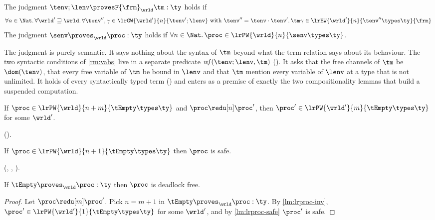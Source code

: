 \begin{definition}
\label{def:sem-judgments}
  The judgment $\tenv ; \lenv \provesF{\frm}_{\wrld} \tm : \ty$ holds if
  \[
    \forall n \in \Nat.\,
      \forall \wrld' \mathrel{\sqsupseteq} \wrld.\,
        \forall \tenv'', \gamma \in \lrGW{\wrld'}{n}{\tenv' ; \lenv}
          \text{ with } \tenv'' = \tenv \cdot \tenv'.\,
          \tm\gamma \in \lrEW{\wrld'}{n}{\tenv'' \types \ty}{\frm}
  \]
  The judgment $\senv \proves_{\wrld} \proc : \ty$ holds if
  $
    \forall n \in \Nat.\,
      \proc \in \lrPW{\wrld}{n}{\senv \types \ty}
  $.
\end{definition}

The judgment is purely semantic. It says nothing about the syntax of
$\tm$ beyond what the term relation says about its behaviour. The two
syntactic conditions of \cref{rm:vabs} live in a separate predicate
$\mathit{wf}(\tenv; \lenv, \tm)$ (). It asks that the free
channels of $\tm$ be $\dom(\tenv)$, that every free variable of $\tm$
be bound in $\lenv$ and that $\tm$ mention every variable of $\lenv$ at
a type that is not unlimited. It holds of every
syntactically typed term () and enters as a
premise of exactly the two compositionality lemmas that build a
suspended computation.

\begin{lemma}
\label{lm:lrproc-inv}
  If $\proc \in \lrPW{\wrld}{n+m}{\tEmpty \types \ty}$ and
  $\proc \redu[n] \proc'$, then
  $\proc' \in \lrPW{\wrld'}{m}{\tEmpty \types \ty}$ for some $\wrld'$.
\end{lemma}

().

\begin{lemma}
\label{lm:lrproc-safe}
  If $\proc \in \lrPW{\wrld}{n+1}{\tEmpty \types \ty}$ then $\proc$ is
  safe.
\end{lemma}

(, , ).

\begin{theorem}
  \label{thm:adequacy}
  If $\tEmpty \proves_{\wrld} \proc : \ty$ then $\proc$ is deadlock
  free.
\end{theorem}

\begin{proof}
  Let $\proc \redu[m] \proc'$. Pick $n = m+1$ in
  $\tEmpty \proves_{\wrld} \proc : \ty$. By
  \cref{lm:lrproc-inv}, $\proc' \in \lrPW{\wrld'}{1}{\tEmpty \types \ty}$
  for some $\wrld'$, and by \cref{lm:lrproc-safe} $\proc'$ is safe.
\end{proof}


